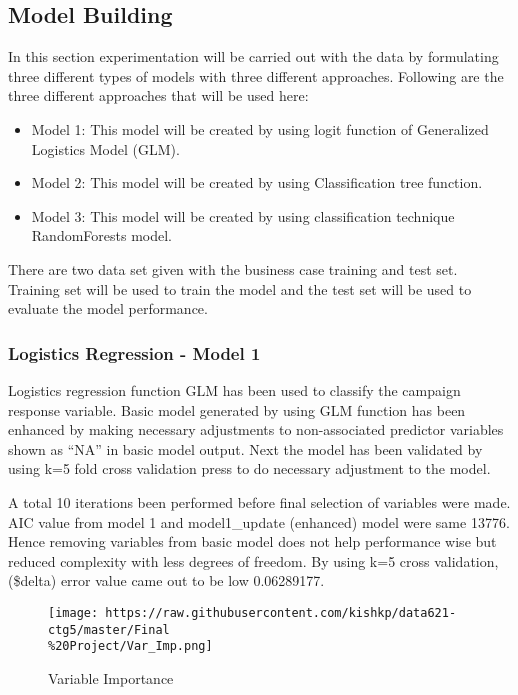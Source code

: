 \documentclass[english,floatsintext,man]{apa6}
\begin{document}
\subsection{Model Building}\label{model-building}

In this section experimentation will be carried out with the data by
formulating three different types of models with three different
approaches. Following are the three different approaches that will be
used here:

\begin{itemize}
\itemsep1pt\parskip0pt
\item
  Model 1: This model will be created by using logit function of
  Generalized Logistics Model (GLM).
\item
  Model 2: This model will be created by using Classification tree
  function.\\
\item
  Model 3: This model will be created by using classification technique
  RandomForests model.
\end{itemize}

There are two data set given with the business case training and test
set. Training set will be used to train the model and the test set will
be used to evaluate the model performance.

\subsubsection{Logistics Regression - Model
1}\label{logistics-regression---model-1}

Logistics regression function GLM has been used to classify the campaign
response variable. Basic model generated by using GLM function has been
enhanced by making necessary adjustments to non-associated predictor
variables shown as \enquote{NA} in basic model output. Next the model
has been validated by using k=5 fold cross validation press to do
necessary adjustment to the model.

A total 10 iterations been performed before final selection of variables
were made. AIC value from model 1 and model1\_update (enhanced) model
were same 13776. Hence removing variables from basic model does not help
performance wise but reduced complexity with less degrees of freedom. By
using k=5 cross validation, (\$delta) error value came out to be low
0.06289177.

\begin{figure}[htbp]
\centering
\texttt{[image: https://raw.githubusercontent.com/kishkp/data621-ctg5/master/Final\\\%20Project/Var\_Imp.png]}
\caption{Variable Importance}
\end{figure}
\end{document}
